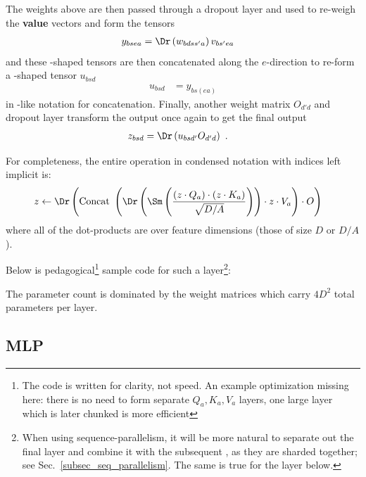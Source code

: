 \documentclass[11pt]{article}
\begin{document}
The weights above are then passed through a dropout layer and used to re-weigh the \textbf{value} vectors and form the tensors
\begin{align}
	y _{ bse a} & =\Dr  \left (w _{ bdss' a} \right ) v _{ bs'ea }
	\label{eq_reweighted_values}
\end{align}
and these -shaped tensors
are then concatenated along the $ e $-direction to re-form a -shaped
tensor $ u _{ bsd } $
\begin{align}
    u _{ bsd } & = y _{ bs(e a) }
\end{align}
in \href{https://einops.rocks/1-einops-basics/}{}-like notation for concatenation.
Finally, another weight matrix $ O _{d' d } $ and dropout layer transform the output once again to get the final
output
\begin{align}
	z _{ bsd } & = \Dr \left (u  _{ bsd' } O _{ d'd }\right )\ .
\end{align}

For completeness, the entire operation in condensed notation with indices left implicit is:
\begin{align}
	z & \leftarrow \Dr \left ({\rm Concat} \ \left ( \Dr \left (\Sm  \left ( \frac{ \left ( z \cdot Q _{ a } \right )\cdot \left ( z \cdot K _{ a } \right )}{ \sqrt{D/A} }
		\right)\right )\cdot z \cdot V _{ a } \right ) \cdot O \right ) \label{eq_causal_attn}
\end{align}
where all of the dot-products are over feature dimensions (those of size $ D $ or $ D/A $).

Below is pedagogical\footnote{The
code is written for clarity, not speed. An example optimization missing here: there is no need to
form separate $ Q _{ a },K _{ a },V _{ a} $  layers, one large layer which is later
chunked is more efficient} sample code for such a   layer\footnote{When
	using sequence-parallelism, it will be more natural to separate out the final  layer
	and combine it with the subsequent , as they are sharded together; see
	Sec.~\ref{subsec_seq_parallelism}. The same is true for the  layer below.}:

The parameter count is dominated by the weight matrices which carry $ 4 D ^{ 2 } $ total parameters
per layer.


\subsection{MLP \label{subsubsec_mlp} }
\end{document}
